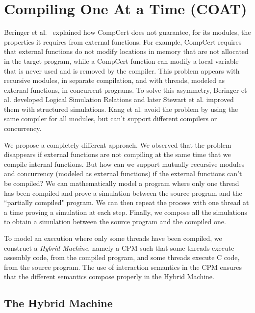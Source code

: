 \section{Compiling One At a Time (COAT)}\label{sec:coat}

Beringer et al.~\cite{bsda:esop2014} explained how CompCert does not guarantee, for its modules, the properties it requires from external functions. For example, CompCert requires that external functions do not modify locations in memory that are not allocated in the target program, while a CompCert function can modify a local variable that is never used and is removed by the compiler. This problem appears with recursive modules, in separate compilation, and with threads, modeled as external functions, in concurrent programs. To solve this asymmetry, Beringer et al. developed Logical Simulation Relations and later Stewart et al. \cite{compcomp} improved them with structured simulations. Kang et al. \cite{Kang2017promising} avoid the problem by using the same compiler for all modules, but can't support different compilers or concurrency.

We propose a completely different approach. We observed that the problem disappears if external functions are not compiling at the same time that we compile internal functions. But how can we support mutually recursive modules and concurrency (modeled as external functions) if the external functions can't be compiled? We can mathematically model a program where only one thread has been compiled and prove a simulation between the source program and the ``partially compiled" program. We can then repeat the process with one thread at a time proving a simulation at each step. Finally, we compose all the simulations to obtain a simulation between the source program and the compiled one.

To model an execution where only some threads have been compiled, we construct a \emph{Hybrid Machine}, namely a CPM such that some threads execute assembly code, from the compiled program, and some threads execute C code, from the source program. The use of interaction semantics in the CPM ensures that the different semantics compose properly in the Hybrid Machine.

 
%

\subsection{The Hybrid Machine}

